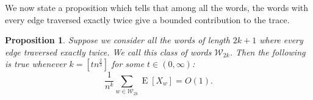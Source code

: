 \documentclass[12pt]{article}
\numberwithin{equation}{section}
\newtheorem{proposition}{Proposition}[section]
\numberwithin{equation}{section}
\theoremstyle{definition}
\DeclareMathOperator{\E}{E} \DeclareMathOperator{\var}{Var}
\renewcommand{\1}{\bf 1}
\begin{document}
We now state a proposition which tells that among all the words, the words with every edge traversed exactly twice give a bounded contribution to the trace.
\begin{proposition}\label{prop:2times}
Suppose we consider all the words of length $2k+1$ where every edge traversed exactly twice. We call this class of words $\mathcal{W}_{2k}$. Then the following is true whenever $k=[tn^{\frac{2}{3}}]$ for some $t\in (0,\infty)$:
\begin{equation}\label{eq:2timescont}
\frac{1}{n^{k}} \sum_{w \in \mathcal{W}_{2k}} \E[X_{w}]= O(1).
\end{equation} 
\end{proposition}
%
%
%
\end{document}
